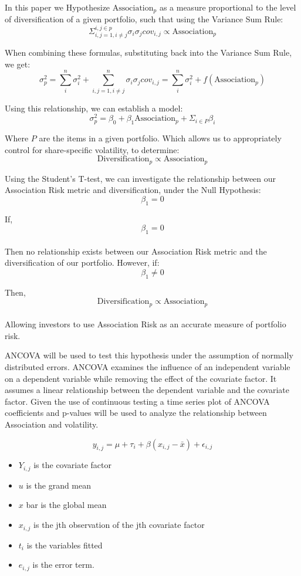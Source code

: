 \documentclass[11pt]{article}
\providecommand{\tightlist}{%
      \setlength{\itemsep}{0pt}\setlength{\parskip}{0pt}}
\begin{document}
In this paper we Hypothesize \(\text{Association}_{p}\) as a measure
proportional to the level of diversification of a given portfolio, such
that using the Variance Sum Rule:\\
\[ \Sigma_{i,j=1, i \ne j}^{i,j \in p} \sigma_{i} \sigma_{j} cov_{i,j} \propto \text{Association}_{p}\]

When combining these formulas, substituting back into the Variance Sum
Rule, we get:
\[ \sigma_{p}^{2} = \sum_{i}^{n} \sigma_{i}^{2} + \sum_{i,j=1, i \ne j}^{n} \sigma_{i} \sigma_{j} cov_{i,j}  = \sum_{i}^{n} \sigma_{i}^{2} + f(\text{Association}_{p}) \]

Using this relationship, we can establish a model:\\
\[ \sigma_{p}^{2} = \beta_{0} + \beta_{1} \text{Association}_{p} + \Sigma_{i \in P} \beta_{i}\]

Where \(P\) are the items in a given portfolio. Which allows us to
appropriately control for share-specific volatility, to determine:\\
\[\text{Diversification}_{p} \propto \text{Association}_{p}\]

Using the Student's T-test, we can investigate the relationship between
our Association Risk metric and diversification, under the Null
Hypothesis:\\
\[\beta_{1} = 0\]

If, \[\beta_{1} = 0\]\\
Then no relationship exists between our Association Risk metric and the
diversification of our portfolio. However, if: \[\beta_{1} \ne 0\]

Then, \[\text{Diversification}_{p} \propto \text{Association}_{p}\]\\
Allowing investors to use Association Risk as an accurate measure of
portfolio risk.

ANCOVA will be used to test this hypothesis under the assumption of
normally distributed errors. ANCOVA examines the influence of an
independent variable on a dependent variable while removing the effect
of the covariate factor. It assumes a linear relationship between the
dependent variable and the covariate factor. Given the use of continuous
testing a time series plot of ANCOVA coefficients and p-values will be
used to analyze the relationship between Association and volatility.

\[ y_{i, j} = \mu + \tau_{i} + \beta (x_{i,j} - \bar{x}) + \epsilon_{i, j} \]

\begin{itemize}
\tightlist
\item
  \(Y_{i, j}\) is the covariate factor
\item
  \(u\) is the grand mean
\item
  \(x\) bar is the global mean\\
\item
  \(x_{i, j}\) is the jth observation of the jth covariate factor\\
\item
  \(t_{i}\) is the variables fitted\\
\item
  \(e_{i, j}\) is the error term.
\end{itemize}
\end{document}
